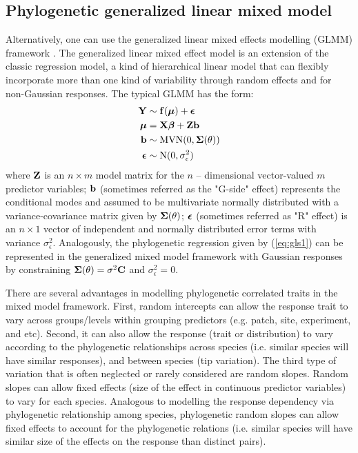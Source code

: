 \documentclass[12pt]{article}
\begin{document}

\subsection*{Phylogenetic generalized linear mixed model}
Alternatively, one can use the generalized linear mixed effects modelling (GLMM) framework \citep{lynch1991methods}.
The generalized linear mixed effect model is an extension of the classic regression model, a kind of hierarchical linear model that can flexibly incorporate more than one kind of variability through random effects and for non-Gaussian responses.
The typical GLMM has the form:
\begin{align}
{\mathbf Y} & \sim \mathbf{f}({\boldsymbol \mu}) + {\boldsymbol \epsilon} \label{eq:glmm1} \\
{\boldsymbol \mu} & = {\mathbf X} {\boldsymbol \beta} + {\mathbf Z} {\mathbf b}  \label{eq:glmm2} \\
{\mathbf b} & \sim \textrm{MVN}(0, {\boldsymbol \Sigma}(\theta)) \label{eq:glmm3} \\
{\boldsymbol \epsilon} & \sim \textrm{N}(0,\sigma^{2}_{\epsilon}) \label{eq:glmm4}
\end{align}
where ${\mathbf Z}$ is an $n \times m$ model matrix for the $n$ -- dimensional vector-valued $m$ predictor variables; ${\mathbf b}$ (sometimes referred as the "G-side" effect) represents the conditional modes and assumed to be multivariate normally distributed with a variance-covariance matrix given by ${\boldsymbol \Sigma}(\theta)$; ${\boldsymbol \epsilon}$ (sometimes referred as "R" effect) is an $n \times 1$ vector of independent and normally distributed error terms with variance $\sigma_{\epsilon}^2$.
Analogously, the phylogenetic regression given by (\ref{eq:gls1}) can be represented in the generalized mixed model framework with Gaussian responses by constraining ${\boldsymbol \Sigma}(\theta) = \sigma^2 {\mathbf C}$ and $\sigma^{2}_{\epsilon} = 0$.

There are several advantages in modelling phylogenetic correlated traits in the mixed model framework.
First, random intercepts can allow the response trait to vary across groups/levels within grouping predictors (e.g. patch, site, experiment, and etc). 
Second, it can also allow the response (trait or distribution) to vary according to the phylogenetic relationships across species (i.e. similar species will have similar responses), and between species (tip variation).
The third type of variation that is often neglected or rarely considered are random slopes.
Random slopes can allow fixed effects (size of the effect in continuous predictor variables) to vary for each species. 
Analogous to modelling the response dependency via phylogenetic relationship among species, phylogenetic random slopes can allow fixed effects to account for the phylogenetic relations (i.e. similar species will have similar size of the effects on the response than distinct pairs).
\end{document}
